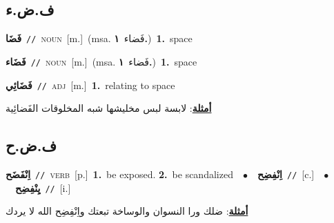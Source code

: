 \documentclass[10pt,a4paper,twoside]{article} %
\begin{document}
\begin{multicols}{2}
\vspace{-3mm}
\subsection*{\color{blue}\foreignlanguage{arabic}{ف.ض.ء}\color{blue}{}} 

{\setlength\topsep{0pt}\textbf{\foreignlanguage{arabic}{فَضَا}}\ {\color{gray}\texttt{//}\color{black}}\ \textsc{noun}\ [m.]\ \color{gray}(msa. \foreignlanguage{arabic}{فَضاء}~\foreignlanguage{arabic}{\textbf{١.}})\color{black}\ \textbf{1.}~space\ } \vspace{2mm}

{\setlength\topsep{0pt}\textbf{\foreignlanguage{arabic}{فَضَاء}}\ {\color{gray}\texttt{//}\color{black}}\ \textsc{noun}\ [m.]\ \color{gray}(msa. \foreignlanguage{arabic}{فَضاء}~\foreignlanguage{arabic}{\textbf{١.}})\color{black}\ \textbf{1.}~space\ } \vspace{2mm}

{\setlength\topsep{0pt}\textbf{\foreignlanguage{arabic}{فَضَائِي}}\ {\color{gray}\texttt{//}\color{black}}\ \textsc{adj}\ [m.]\ \textbf{1.}~relating to space\  \begin{flushright}\color{gray}\foreignlanguage{arabic}{\textbf{\underline{\foreignlanguage{arabic}{أمثلة}}}: لابسة لبس مخليشها شبه المخلوقات الفَضائِية}\end{flushright}\color{black}} \vspace{2mm}

\vspace{-3mm}
\subsection*{\color{blue}\foreignlanguage{arabic}{ف.ض.ح}\color{blue}{}} 

{\setlength\topsep{0pt}\textbf{\foreignlanguage{arabic}{اِنْفَضَح}}\ {\color{gray}\texttt{//}\color{black}}\ \textsc{verb}\ [p.]\ \textbf{1.}~be exposed.  \textbf{2.}~be scandalized\ \ $\bullet$\ \ \setlength\topsep{0pt}\textbf{\foreignlanguage{arabic}{اِنْفِضِح}}\ {\color{gray}\texttt{//}\color{black}}\ [c.]\ \ $\bullet$\ \ \setlength\topsep{0pt}\textbf{\foreignlanguage{arabic}{يِنْفِضِح}}\ {\color{gray}\texttt{//}\color{black}}\ [i.]\  \begin{flushright}\color{gray}\foreignlanguage{arabic}{\textbf{\underline{\foreignlanguage{arabic}{أمثلة}}}: ضلك ورا النسوان والوساخة تبعتك واِنْفِضِح الله لا يردك}\end{flushright}\color{black}} \vspace{2mm}


\end{multicols}
\end{document}
